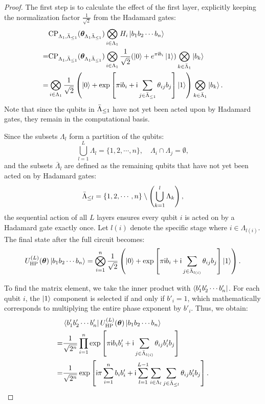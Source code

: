 \begin{proof}
    The first step is to calculate the effect of the first layer, explicitly keeping the normalization factor $\frac{1}{\sqrt{2}}$ from the Hadamard gates:
    \begin{align}
        &\mathrm{CP}_{\Lambda_1, \bar{\Lambda}_{\leq 1}}(\bm{\theta}_{\Lambda_1 \bar{\Lambda}_{\leq 1}}  ) \bigotimes_{i \in \Lambda_1} H_{i}\ket{b_1 b_2\cdots b_n}\notag\\
        =& \mathrm{CP}_{\Lambda_1, \bar{\Lambda}_{\leq 1}}(\bm{\theta}_{\Lambda_1\bar{\Lambda}_{\leq 1}}) \bigotimes_{i \in \Lambda_1}\frac{1}{\sqrt{2}}(\ket{0} + e^{\pi \mathsf{i} b_i} \ket{1}) \bigotimes_{k \in \bar \Lambda_1} \ket{b_k} \\
        =& \bigotimes_{i \in \Lambda_1}\frac{1}{\sqrt{2}}\left(\ket{0} + \exp\left[\pi \mathsf{i} b_i + \mathsf{i} \sum_{j \in \bar{\Lambda}_{\leq 1}} \theta_{ij} b_j\right] \ket{1}\right) \bigotimes_{k \in \bar \Lambda_1} \ket{b_k}.
    \end{align}
    Note that since the qubits in $\bar{\Lambda}_{\leq 1}$ have not yet been acted upon by Hadamard gates, they remain in the computational basis. 
    
    Since the subsets \(\Lambda_l\) form a partition of the qubits:
    \begin{equation}
        \bigcup_{l=1}^L \Lambda_l = \{1,2,\cdots, n\}, \quad
        \Lambda_i \cap \Lambda_j = \emptyset,
    \end{equation}
    and the subsets \(\bar{\Lambda}_l\) are defined as the remaining qubits that have not yet been acted on by Hadamard gates:
    \begin{equation}
        \bar{\Lambda}_{\leq l} = \{1,2,\cdots, n\}\setminus \left(\bigcup_{k = 1}^l \Lambda_k\right),
    \end{equation}
    the sequential action of all $L$ layers ensures every qubit $i$ is acted on by a Hadamard gate exactly once. Let $l(i)$ denote the specific stage where $i \in \Lambda_{l(i)}$. The final state after the full circuit becomes:
    \begin{equation}
        U_{\mathrm{HP}}^{(L)}(\bm \theta) \ket{b_1 b_2\cdots b_n} = \bigotimes_{i=1}^n \frac{1}{\sqrt{2}} \left(\ket{0} + \exp\left[\pi \mathsf{i} b_i + \mathsf{i} \sum_{j \in \bar{\Lambda}_{l(i)}} \theta_{ij} b_j\right] \ket{1}\right).
    \end{equation}
    
    To find the matrix element, we take the inner product with $\bra{b'_1 b'_2 \cdots b'_n}$. For each qubit $i$, the $\ket{1}$ component is selected if and only if $b'_i = 1$, which mathematically corresponds to multiplying the entire phase exponent by $b'_i$. Thus, we obtain:
    \begin{align}
        &\bra{b'_1 b'_2 \cdots b'_n} U_{\mathrm{HP}}^{(L)}(\bm \theta) \ket{b_1 b_2\cdots b_n}\notag\\
        =& \frac{1}{\sqrt{2^n}} \prod_{i=1}^n \exp\left[ \pi \mathsf{i} b_i b'_i + \mathsf{i} \sum_{j \in \bar{\Lambda}_{l(i)}} \theta_{ij} b'_i b_j \right]\\
        =& \frac{1}{\sqrt{2^n}} \exp\left[ \mathsf{i} \pi \sum_{i=1}^n b_i b'_i + \mathsf{i} \sum_{l=1}^{L-1} \sum_{i \in \Lambda_l} \sum_{j \in \bar{\Lambda}_{\leq l}} \theta_{ij} b'_i b_j \right].
    \end{align}
    

\end{proof}
